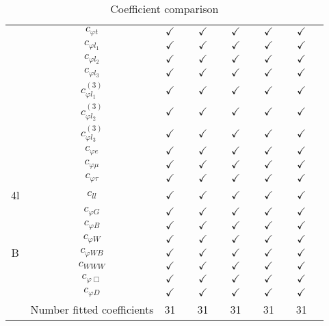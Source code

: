 \documentclass{article}
\begin{document}
\begin{table}[H]
\begin{tabular}{|c|c|c|c|c|c|c|c|c|c|c|c|}
 & $c_{\varphi t}$ & $\checkmark$ &  & $\checkmark$ &  & $\checkmark$ &  & $\checkmark$ &  & $\checkmark$ & \\ \cline{2-12}
 & $c_{\varphi l_1}$ & $\checkmark$ &  & $\checkmark$ &  & $\checkmark$ &  & $\checkmark$ &  & $\checkmark$ & \\ \cline{2-12}
 & $c_{\varphi l_2}$ & $\checkmark$ &  & $\checkmark$ &  & $\checkmark$ &  & $\checkmark$ &  & $\checkmark$ & \\ \cline{2-12}
 & $c_{\varphi l_3}$ & $\checkmark$ &  & $\checkmark$ &  & $\checkmark$ &  & $\checkmark$ &  & $\checkmark$ & \\ \cline{2-12}
 & $c_{\varphi l_1}^{(3)}$ & $\checkmark$ &  & $\checkmark$ &  & $\checkmark$ &  & $\checkmark$ &  & $\checkmark$ & \\ \cline{2-12}
 & $c_{\varphi l_2}^{(3)}$ & $\checkmark$ &  & $\checkmark$ &  & $\checkmark$ &  & $\checkmark$ &  & $\checkmark$ & \\ \cline{2-12}
 & $c_{\varphi l_3}^{(3)}$ & $\checkmark$ &  & $\checkmark$ &  & $\checkmark$ &  & $\checkmark$ &  & $\checkmark$ & \\ \cline{2-12}
 & $c_{\varphi e}$ & $\checkmark$ &  & $\checkmark$ &  & $\checkmark$ &  & $\checkmark$ &  & $\checkmark$ & \\ \cline{2-12}
 & $c_{\varphi \mu}$ & $\checkmark$ &  & $\checkmark$ &  & $\checkmark$ &  & $\checkmark$ &  & $\checkmark$ & \\ \cline{2-12}
 & $c_{\varphi \tau}$ & $\checkmark$ &  & $\checkmark$ &  & $\checkmark$ &  & $\checkmark$ &  & $\checkmark$ &
\\ \hline
\multirow{1}{*}{4l}
 & $c_{ll}$ & $\checkmark$ &  & $\checkmark$ &  & $\checkmark$ &  & $\checkmark$ &  & $\checkmark$ &
\\ \hline
\multirow{7}{*}{B}
 & $c_{\varphi G}$ & $\checkmark$ &  & $\checkmark$ &  & $\checkmark$ &  & $\checkmark$ &  & $\checkmark$ & \\ \cline{2-12}
 & $c_{\varphi B}$ & $\checkmark$ &  & $\checkmark$ &  & $\checkmark$ &  & $\checkmark$ &  & $\checkmark$ & \\ \cline{2-12}
 & $c_{\varphi W}$ & $\checkmark$ &  & $\checkmark$ &  & $\checkmark$ &  & $\checkmark$ &  & $\checkmark$ & \\ \cline{2-12}
 & $c_{\varphi WB}$ & $\checkmark$ &  & $\checkmark$ &  & $\checkmark$ &  & $\checkmark$ &  & $\checkmark$ & \\ \cline{2-12}
 & $c_{WWW}$ & $\checkmark$ &  & $\checkmark$ &  & $\checkmark$ &  & $\checkmark$ &  & $\checkmark$ & \\ \cline{2-12}
 & $c_{\varphi \Box}$ & $\checkmark$ &  & $\checkmark$ &  & $\checkmark$ &  & $\checkmark$ &  & $\checkmark$ & \\ \cline{2-12}
 & $c_{\varphi D}$ & $\checkmark$ &  & $\checkmark$ &  & $\checkmark$ &  & $\checkmark$ &  & $\checkmark$ &
\\ \hline
\hline & Number fitted coefficients & 31 &  & 31 &  & 31 &  & 31 &  & 31 &  \\ \hline
\end{tabular}
\caption{Coefficient comparison}
\end{table}
\end{document}
